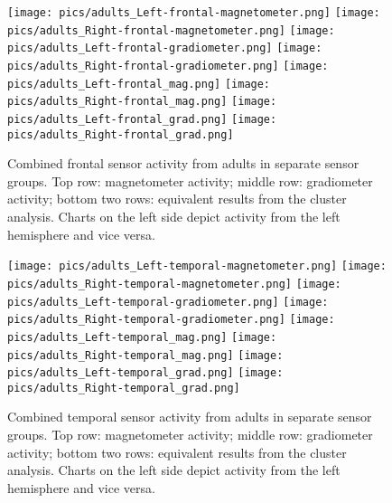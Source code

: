 \begin{figure}[!h]
\begin{center}
\texttt{[image: pics/adults\_Left-frontal-magnetometer.png]}
\texttt{[image: pics/adults\_Right-frontal-magnetometer.png]}
\texttt{[image: pics/adults\_Left-frontal-gradiometer.png]}
\texttt{[image: pics/adults\_Right-frontal-gradiometer.png]}
\texttt{[image: pics/adults\_Left-frontal\_mag.png]}
\texttt{[image: pics/adults\_Right-frontal\_mag.png]}
\texttt{[image: pics/adults\_Left-frontal\_grad.png]}
\texttt{[image: pics/adults\_Right-frontal\_grad.png]}
\caption{\label{4.2.activity.adults.frontal} Combined frontal sensor activity from adults in separate sensor groups. Top row: magnetometer activity; middle row: gradiometer activity; bottom two rows: equivalent results from the cluster analysis. Charts on the left side depict activity from the left hemisphere and vice versa.}
\end{center}
\end{figure}


\begin{figure}[!h]
\begin{center}
\texttt{[image: pics/adults\_Left-temporal-magnetometer.png]}
\texttt{[image: pics/adults\_Right-temporal-magnetometer.png]}
\texttt{[image: pics/adults\_Left-temporal-gradiometer.png]}
\texttt{[image: pics/adults\_Right-temporal-gradiometer.png]}
\texttt{[image: pics/adults\_Left-temporal\_mag.png]}
\texttt{[image: pics/adults\_Right-temporal\_mag.png]}
\texttt{[image: pics/adults\_Left-temporal\_grad.png]}
\texttt{[image: pics/adults\_Right-temporal\_grad.png]}
\caption{\label{4.2.activity.adults.temporal} Combined temporal sensor activity from adults in separate sensor groups. Top row: magnetometer activity; middle row: gradiometer activity; bottom two rows: equivalent results from the cluster analysis. Charts on the left side depict activity from the left hemisphere and vice versa.}
\end{center}
\end{figure}


